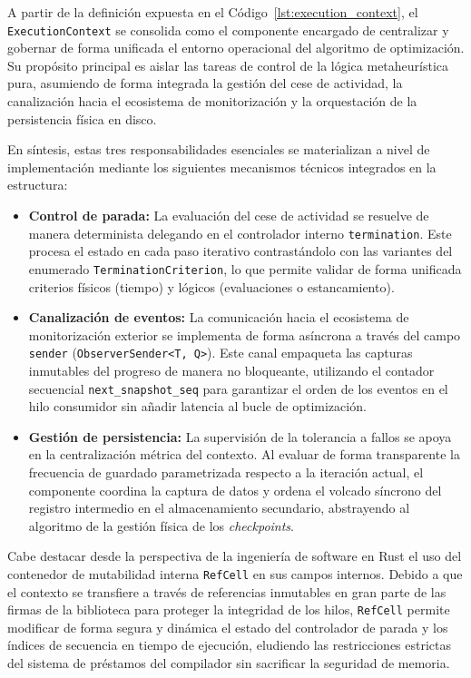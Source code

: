 \documentclass[12pt,a4paper,twoside,openright]{book}
\begin{document}
        A partir de la definición expuesta en el Código~\ref{lst:execution_context}, el \texttt{ExecutionContext} se consolida como el componente encargado de centralizar y gobernar de forma unificada el entorno operacional del algoritmo de optimización. Su propósito principal es aislar las tareas de control de la lógica metaheurística pura, asumiendo de forma integrada la gestión del cese de actividad, la canalización hacia el ecosistema de monitorización y la orquestación de la persistencia física en disco.

        En síntesis, estas tres responsabilidades esenciales se materializan a nivel de implementación mediante los siguientes mecanismos técnicos integrados en la estructura:
        
        \begin{itemize}
            \item \textbf{Control de parada:} La evaluación del cese de actividad se resuelve de manera determinista delegando en el controlador interno \texttt{termination}. Este procesa el estado en cada paso iterativo contrastándolo con las variantes del enumerado \texttt{TerminationCriterion}, lo que permite validar de forma unificada criterios físicos (tiempo) y lógicos (evaluaciones o estancamiento).
            \item \textbf{Canalización de eventos:} La comunicación hacia el ecosistema de monitorización exterior se implementa de forma asíncrona a través del campo \texttt{sender} (\texttt{ObserverSender<T, Q>}). Este canal empaqueta las capturas inmutables del progreso de manera no bloqueante, utilizando el contador secuencial \texttt{next\_snapshot\_seq} para garantizar el orden de los eventos en el hilo consumidor sin añadir latencia al bucle de optimización.
            \item \textbf{Gestión de persistencia:} La supervisión de la tolerancia a fallos se apoya en la centralización métrica del contexto. Al evaluar de forma transparente la frecuencia de guardado parametrizada respecto a la iteración actual, el componente coordina la captura de datos y ordena el volcado síncrono del registro intermedio en el almacenamiento secundario, abstrayendo al algoritmo de la gestión física de los \textit{checkpoints}.
        \end{itemize}

        Cabe destacar desde la perspectiva de la ingeniería de software en Rust el uso del contenedor de mutabilidad interna \texttt{RefCell} en sus campos internos. Debido a que el contexto se transfiere a través de referencias inmutables en gran parte de las firmas de la biblioteca para proteger la integridad de los hilos, \texttt{RefCell} permite modificar de forma segura y dinámica el estado del controlador de parada y los índices de secuencia en tiempo de ejecución, eludiendo las restricciones estrictas del sistema de préstamos del compilador sin sacrificar la seguridad de memoria.
        
\end{document}
